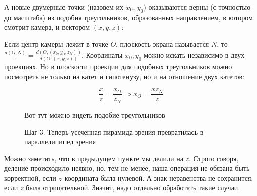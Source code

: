 \documentclass{article}
\begin{document}
А новые двумерные точки (назовем их $x_0$, $y_0$) оказываются верны (с точностью до масштаба) из подобия треугольников, образованных направлением, в котором смотрит камера, и вектором $(x, y, z)$:

Если центр камеры лежит в точке $O$, плоскость экрана называется $N$, то $\frac{d(O, N)}{z} = \frac{d(O, (x_0, y_0, z_N))}{d(O, (x, y, z))}$. Координаты $x_0, y_0$ можно искать независимо в двух проекциях. Но в плоскости проекции для подобных треугольников можно посмотреть не только на катет и гипотенузу, но и на отношение двух катетов:

$$\frac{x}{z} = \frac{x_O}{z_N} \Rightarrow x_O = \frac{x z_N}{z}$$

\begin{center}
\begin{figure}[H]
\caption{Вот тут можно видеть подобие треугольников}
\label{ris:image}
\end{figure}
\end{center}

\begin{center}
\begin{figure}[H]
\caption{Шаг 3. Теперь усеченная пирамида зрения превратилась в параллелипипед зрения}
\label{ris:image}
\end{figure}
\end{center}


Можно заметить, что в предыдущем пункте мы делили на $z$. Строго говоря, деление происходило неявно, но, тем не менее, наша операция не обязана быть корректной, если $z$-координата была нулевой. А знак неравенства не сохранится, если $z$ была отрицательной. Значит, надо отдельно обработать такие случаи.
\end{document}
